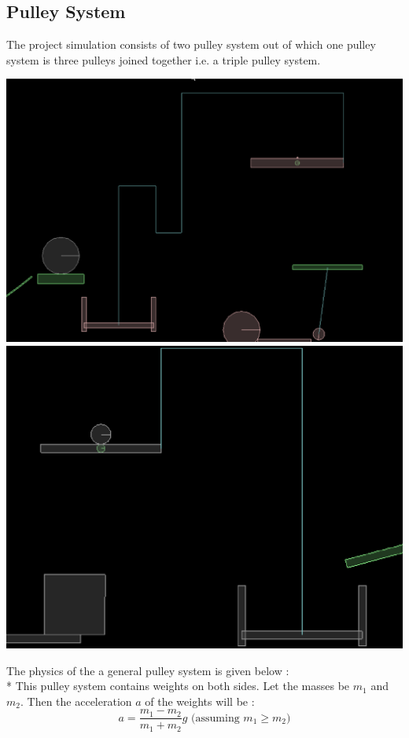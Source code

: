 \documentclass[11pt]{article}
\begin{document}
\subsection{Pulley System}
The project simulation consists of two pulley system out of which one pulley system is three pulleys joined together i.e. a triple pulley system.
\begin{center}
\includegraphics[scale=0.5]{pulley1}
\includegraphics[scale=0.5]{pulley2}
\end{center}
The physics of the a general pulley system is given below :\\*
This pulley\cite{pulley} system contains weights on both sides. Let the masses be $m_1$ and $m_2$. Then the acceleration $a$ of the weights will be :
\begin{equation}
                                                   a = \frac{m_1 - m_2}{m_1 + m_2}g \mbox{ (assuming $m_1 \geq m_2$)}
\end{equation}
\end{document}
